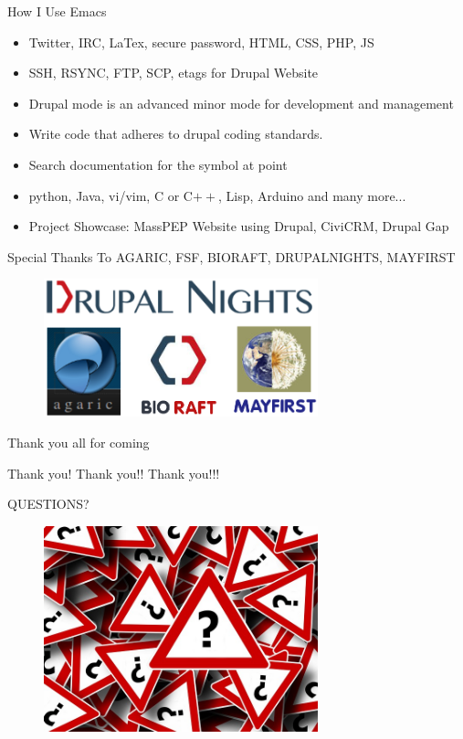 \documentclass[english,12pt,presentation]{beamer}
\begin{document}
\begin{frame}{How I Use Emacs}
\begin{itemize}
\pause \item Twitter, IRC, LaTex, secure password, HTML, CSS, PHP, JS
\pause \item SSH, RSYNC, FTP, SCP, etags for Drupal Website
\pause \item Drupal mode is an advanced minor mode for development and management
\pause \item Write code that adheres to drupal coding standards.
\pause \item Search documentation for the symbol at point
\pause \item python, Java, vi/vim, C or C$++$, Lisp, Arduino and many more...
\pause \item Project Showcase: MassPEP Website using Drupal, CiviCRM, Drupal Gap
\end{itemize}
\end{frame}

\begin{frame}{Special Thanks To AGARIC, FSF, BIORAFT, DRUPALNIGHTS, MAYFIRST}
\begin{figure}
\centering
\includegraphics[width=300]{images/specialthanks.png}
\end{figure}
\end{frame}

\begin{frame}{Thank you all for coming}
\item Thank you! Thank you!! Thank you!!!
\end{frame}

\begin{frame}{QUESTIONS?}
\begin{figure}
\centering
\includegraphics[width=300]{images/q.png}
\end{figure}
\end{frame}
\end{document}
